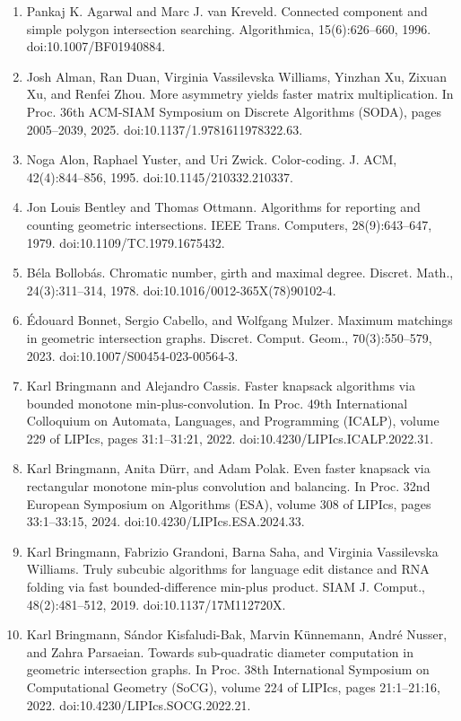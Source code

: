\documentclass[10pt,a4paper]{article}
\begin{document}
\begin{enumerate}
\item[]  [1]  Pankaj K. Agarwal and Marc J. van Kreveld.  Connected component and simple polygon intersection searching.  Algorithmica, 15(6):626–660, 1996.  doi:10.1007/BF01940884.  
\item[]  [2]  Josh Alman, Ran Duan, Virginia Vassilevska Williams, Yinzhan Xu, Zixuan Xu, and Renfei Zhou.  More asymmetry yields faster matrix multiplication.  In Proc. 36th ACM-SIAM Symposium on Discrete Algorithms (SODA), pages 2005–2039, 2025.  doi:10.1137/1.9781611978322.63.  
\item[]  [3]  Noga Alon, Raphael Yuster, and Uri Zwick.  Color-coding.  J. ACM, 42(4):844–856, 1995.  doi:10.1145/210332.210337.  
\item[]  [4]  Jon Louis Bentley and Thomas Ottmann.  Algorithms for reporting and counting geometric intersections.  IEEE Trans. Computers, 28(9):643–647, 1979.  doi:10.1109/TC.1979.1675432.  
\item[]  [5]  Béla Bollobás.  Chromatic number, girth and maximal degree.  Discret. Math., 24(3):311–314, 1978.  doi:10.1016/0012-365X(78)90102-4.  
\item[]  [6]  Édouard Bonnet, Sergio Cabello, and Wolfgang Mulzer.  Maximum matchings in geometric intersection graphs.  Discret. Comput. Geom., 70(3):550–579, 2023.  doi:10.1007/S00454-023-00564-3.  
\item[]  [7]  Karl Bringmann and Alejandro Cassis.  Faster knapsack algorithms via bounded monotone min-plus-convolution.  In Proc. 49th International Colloquium on Automata, Languages, and Programming (ICALP), volume 229 of LIPIcs, pages 31:1–31:21, 2022.  doi:10.4230/LIPIcs.ICALP.2022.31.  
\item[]  [8]  Karl Bringmann, Anita Dürr, and Adam Polak.  Even faster knapsack via rectangular monotone min-plus convolution and balancing.  In Proc. 32nd European Symposium on Algorithms (ESA), volume 308 of LIPIcs, pages 33:1–33:15, 2024.  doi:10.4230/LIPIcs.ESA.2024.33.  
\item[]  [9]  Karl Bringmann, Fabrizio Grandoni, Barna Saha, and Virginia Vassilevska Williams.  Truly subcubic algorithms for language edit distance and RNA folding via fast bounded-difference min-plus product.  SIAM J. Comput., 48(2):481–512, 2019.  doi:10.1137/17M112720X.  
\item[]  [10]  Karl Bringmann, Sándor Kisfaludi-Bak, Marvin Künnemann, André Nusser, and Zahra Parsaeian.  Towards sub-quadratic diameter computation in geometric intersection graphs.  In Proc. 38th International Symposium on Computational Geometry (SoCG), volume 224 of LIPIcs, pages 21:1–21:16, 2022.  doi:10.4230/LIPIcs.SOCG.2022.21.  

\end{enumerate}
\end{document}
